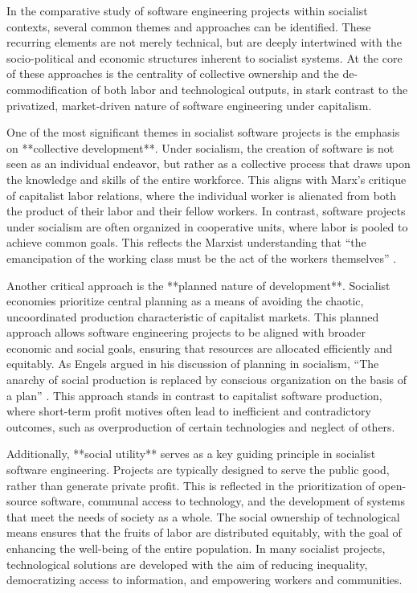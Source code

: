 \begin{refsection}
In the comparative study of software engineering projects within socialist contexts, several common themes and approaches can be identified. These recurring elements are not merely technical, but are deeply intertwined with the socio-political and economic structures inherent to socialist systems. At the core of these approaches is the centrality of collective ownership and the de-commodification of both labor and technological outputs, in stark contrast to the privatized, market-driven nature of software engineering under capitalism.

One of the most significant themes in socialist software projects is the emphasis on **collective development**. Under socialism, the creation of software is not seen as an individual endeavor, but rather as a collective process that draws upon the knowledge and skills of the entire workforce. This aligns with Marx's critique of capitalist labor relations, where the individual worker is alienated from both the product of their labor and their fellow workers. In contrast, software projects under socialism are often organized in cooperative units, where labor is pooled to achieve common goals. This reflects the Marxist understanding that “the emancipation of the working class must be the act of the workers themselves” \cite[pp.~40]{marx1864}.

Another critical approach is the **planned nature of development**. Socialist economies prioritize central planning as a means of avoiding the chaotic, uncoordinated production characteristic of capitalist markets. This planned approach allows software engineering projects to be aligned with broader economic and social goals, ensuring that resources are allocated efficiently and equitably. As Engels argued in his discussion of planning in socialism, “The anarchy of social production is replaced by conscious organization on the basis of a plan” \cite[pp.~77]{engels1878}. This approach stands in contrast to capitalist software production, where short-term profit motives often lead to inefficient and contradictory outcomes, such as overproduction of certain technologies and neglect of others.

Additionally, **social utility** serves as a key guiding principle in socialist software engineering. Projects are typically designed to serve the public good, rather than generate private profit. This is reflected in the prioritization of open-source software, communal access to technology, and the development of systems that meet the needs of society as a whole. The social ownership of technological means ensures that the fruits of labor are distributed equitably, with the goal of enhancing the well-being of the entire population. In many socialist projects, technological solutions are developed with the aim of reducing inequality, democratizing access to information, and empowering workers and communities.


\end{refsection}
